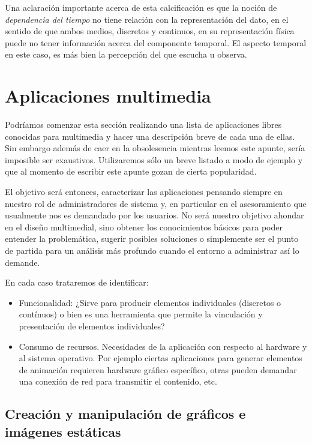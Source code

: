 \documentclass[12pt]{article}
\begin{document}
Una aclaración importante acerca de esta calcificación es que la noción 
de {\it dependencia del tiempo} no tiene relación con la representación
del dato, en el sentido de que ambos medios, discretos y continuos, en su 
representación física puede no tener información acerca del componente 
temporal. El aspecto temporal en este caso, es más bien la percepción del 
que escucha u observa.\cite{ramyer}  

\section*{Aplicaciones multimedia}

Podríamos comenzar esta sección realizando una lista de aplicaciones 
libres conocidas para multimedia y hacer una descripción breve de cada
una de ellas. Sin embargo además de caer en la obsolesencia mientras 
leemos este apunte, sería imposible ser exaustivos. Utilizaremos sólo
un breve listado a modo de ejemplo y que al momento de escribir este 
apunte gozan de cierta popularidad.  

El objetivo será entonces, caracterizar las aplicaciones pensando
siempre en nuestro rol de administradores de sistema y, en particular 
en el asesoramiento que usualmente nos es demandado por los usuarios. No
será nuestro objetivo ahondar en el diseño multimedial, sino obtener 
los conocimientos básicos para poder entender la problemática, sugerir 
posibles soluciones o simplemente ser el punto de partida para un análisis 
más profundo cuando el entorno a administrar así lo demande. 

En cada caso trataremos de identificar: 
\begin{itemize}
\item Funcionalidad: ¿Sirve para producir elementos individuales (discretos o contínuos) o 
bien es una herramienta que permite la vinculación y presentación de elementos individuales? 
\item Consumo de recursos. Necesidades de la aplicación con respecto al 
hardware y al sistema operativo. Por ejemplo ciertas aplicaciones para generar 
elementos de animación requieren hardware gráfico específico, otras pueden demandar 
una conexión de red para transmitir el contenido, etc. 
\end{itemize}

\subsection*{Creación y manipulación de gráficos e imágenes estáticas}
\end{document}
